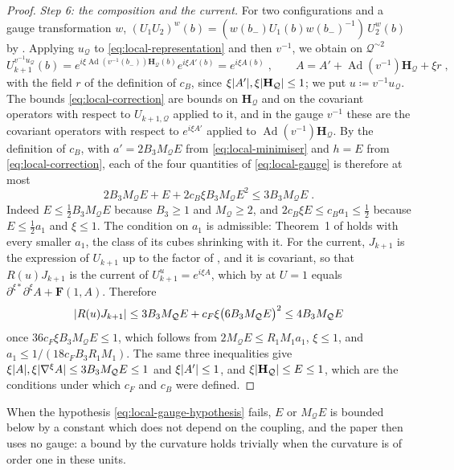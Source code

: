 \documentclass[11pt]{preprint}
\DeclarePairedDelimiter{\abs}{\lvert}{\rvert}
\numberwithin{equation}{section}
\theoremstyle{definition}
\theoremstyle{remark}
\theoremstyle{plain}
\begin{document}
\begin{proof}
\emph{Step 6: the composition and the current.} For two configurations and a gauge transformation $w$, $(U_1U_2)^w(b) = (w(b_-)U_1(b)w(b_-)^{-1})\,U_2^w(b)$ by \cite[(1.17), p.~250]{BalabanCRE}. Applying $u_{\mathcal Q}$ to \eqref{eq:local-representation} and then $v^{-1}$, we obtain on $\mathcal Q^{\sim2}$
\[
    U_{k+1}^{v^{-1}u_{\mathcal Q}}(b) = e^{i\xi\operatorname{Ad}(v^{-1}(b_-))\mathbf H_{\mathcal Q}(b)}e^{i\xi A'(b)} = e^{i\xi A(b)}\;,
    \qquad
    A = A' + \operatorname{Ad}(v^{-1})\mathbf H_{\mathcal Q} + \xi r\;,
\]
with the field $r$ of the definition of $c_B$, since $\xi\abs{A'}, \xi\abs{\mathbf H_{\mathcal Q}} \leq 1$; we put $u \coloneqq v^{-1}u_{\mathcal Q}$. The bounds \eqref{eq:local-correction} are bounds on $\mathbf H_{\mathcal Q}$ and on the covariant operators with respect to $U_{k+1,\mathcal Q}$ applied to it, and in the gauge $v^{-1}$ these are the covariant operators with respect to $e^{i\xi A'}$ applied to $\operatorname{Ad}(v^{-1})\mathbf H_{\mathcal Q}$. By the definition of $c_B$, with $a' = 2B_3M_{\mathcal Q}E$ from \eqref{eq:local-minimiser} and $h = E$ from \eqref{eq:local-correction}, each of the four quantities of \eqref{eq:local-gauge} is therefore at most
\[
    2B_3M_{\mathcal Q}E + E + 2c_B\xi B_3M_{\mathcal Q}E^2 \leq 3B_3M_{\mathcal Q}E\;.
\]
Indeed $E \leq \frac12B_3M_{\mathcal Q}E$ because $B_3 \geq 1$ and $M_{\mathcal Q} \geq 2$, and $2c_B\xi E \leq c_Ba_1 \leq \frac12$ because $E \leq \frac12a_1$ and $\xi \leq 1$. The condition on $a_1$ is admissible: Theorem~1 of \cite{BalabanVAR} holds with every smaller $a_1$, the class of its cubes shrinking with it. For the current, $J_{k+1}$ is the expression \cite[(1.8)]{BalabanRG1} of $U_{k+1}$ up to the factor of \cite[(3.12)]{BalabanRG1}, and it is covariant, so that $R(u)J_{k+1}$ is the current of $U_{k+1}^u = e^{i\xi A}$, which by \cite[(3.11)]{BalabanRG1} at $U = 1$ equals $\partial^{\xi*}\partial^\xi A + \mathbf F(1, A)$. Therefore
\[
    \abs{R(u)J_{k+1}} \leq 3B_3M_{\mathcal Q}E + c_F\xi\bigl(6B_3M_{\mathcal Q}E\bigr)^2 \leq 4B_3M_{\mathcal Q}E
\]
once $36c_F\xi B_3M_{\mathcal Q}E \leq 1$, which follows from $2M_{\mathcal Q}E \leq R_1M_1a_1$, $\xi \leq 1$, and $a_1 \leq 1/(18c_FB_3R_1M_1)$. The same three inequalities give $\xi\abs A, \xi\abs{\nabla^\xi A} \leq 3B_3M_{\mathcal Q}E \leq 1$ and $\xi\abs{A'} \leq 1$, and $\xi\abs{\mathbf H_{\mathcal Q}} \leq E \leq 1$, which are the conditions under which $c_F$ and $c_B$ were defined.
\end{proof}

When the hypothesis \eqref{eq:local-gauge-hypothesis} fails, $E$ or $M_{\mathcal Q}E$ is bounded below by a constant which does not depend on the coupling, and the paper then uses no gauge: a bound by the curvature holds trivially when the curvature is of order one in these units.
\end{document}
